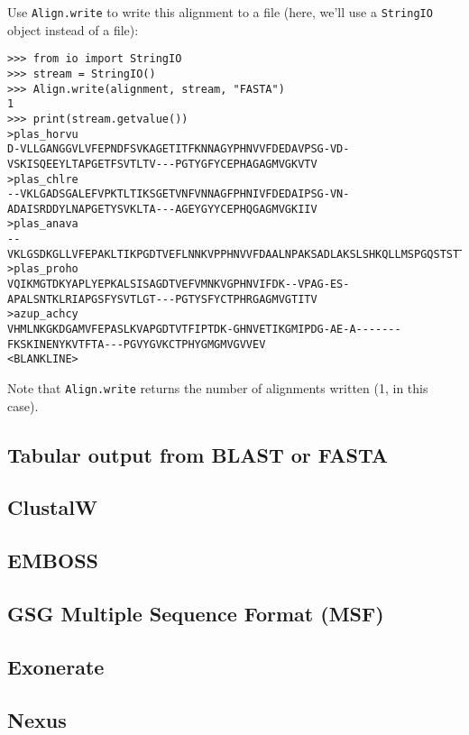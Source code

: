 Use \verb|Align.write| to write this alignment to a file (here, we'll use a \verb|StringIO| object instead of a file):
\begin{verbatim}
>>> from io import StringIO
>>> stream = StringIO()
>>> Align.write(alignment, stream, "FASTA")
1
>>> print(stream.getvalue())
>plas_horvu
D-VLLGANGGVLVFEPNDFSVKAGETITFKNNAGYPHNVVFDEDAVPSG-VD-VSKISQEEYLTAPGETFSVTLTV---PGTYGFYCEPHAGAGMVGKVTV
>plas_chlre
--VKLGADSGALEFVPKTLTIKSGETVNFVNNAGFPHNIVFDEDAIPSG-VN-ADAISRDDYLNAPGETYSVKLTA---AGEYGYYCEPHQGAGMVGKIIV
>plas_anava
--VKLGSDKGLLVFEPAKLTIKPGDTVEFLNNKVPPHNVVFDAALNPAKSADLAKSLSHKQLLMSPGQSTSTTFPADAPAGEYTFYCEPHRGAGMVGKITV
>plas_proho
VQIKMGTDKYAPLYEPKALSISAGDTVEFVMNKVGPHNVIFDK--VPAG-ES-APALSNTKLRIAPGSFYSVTLGT---PGTYSFYCTPHRGAGMVGTITV
>azup_achcy
VHMLNKGKDGAMVFEPASLKVAPGDTVTFIPTDK-GHNVETIKGMIPDG-AE-A-------FKSKINENYKVTFTA---PGVYGVKCTPHYGMGMVGVVEV
<BLANKLINE>
\end{verbatim}
Note that \verb|Align.write| returns the number of alignments written (1, in this case).

\subsection{Tabular output from BLAST or FASTA}
\label{subsec:align_tabular}

\subsection{ClustalW}
\label{subsec:align_clustal}

\subsection{EMBOSS}
\label{subsec:align_emboss}

\subsection{GSG Multiple Sequence Format (MSF)}
\label{subsec:align_msf}

\subsection{Exonerate}
\label{subsec:align_exonerate}

\subsection{Nexus}
\label{subsec:align_nexus}

